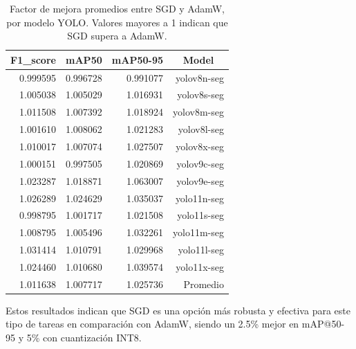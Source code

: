 \begin{table}[htbp]
\centering
\caption[Factor de mejora entre SGD y AdamW en Deepfish, por modelo]{Factor de mejora promedios entre SGD y AdamW, por modelo YOLO. Valores mayores a 1 indican que SGD supera a AdamW.}
\label{tab:deepfish_factorMejora_optimizer_by_model}
\begin{tabular}{|r|r|r|r|}
\hline
\multicolumn{1}{|c|}{\textbf{F1\_score}} & \multicolumn{1}{c|}{\textbf{mAP50}} & \multicolumn{1}{c|}{\textbf{mAP50-95}} & \multicolumn{1}{c|}{\textbf{Model}} \\ \hline
0.999595 & 0.996728 & 0.991077 & yolov8n-seg \\ \hline
1.005038 & 1.005029 & 1.016931 & yolov8s-seg \\ \hline
1.011508 & 1.007392 & 1.018924 & yolov8m-seg \\ \hline
1.001610 & 1.008062 & 1.021283 & yolov8l-seg \\ \hline
1.010017 & 1.007074 & 1.027507 & yolov8x-seg \\ \hline
1.000151 & 0.997505 & 1.020869 & yolov9c-seg \\ \hline
1.023287 & 1.018871 & 1.063007 & yolov9e-seg \\ \hline
1.026289 & 1.024629 & 1.035037 & yolo11n-seg \\ \hline
0.998795 & 1.001717 & 1.021508 & yolo11s-seg \\ \hline
1.008795 & 1.005496 & 1.032261 & yolo11m-seg \\ \hline
1.031414 & 1.010791 & 1.029968 & yolo11l-seg \\ \hline
1.024460 & 1.010680 & 1.039574 & yolo11x-seg \\ \hline
1.011638 & 1.007717 & 1.025736 & Promedio \\ \hline
\end{tabular}
\end{table}

Estos resultados indican que SGD es una opción más robusta y efectiva para este tipo de tareas en comparación con AdamW, siendo un 2.5\% mejor en mAP@50-95 y 5\% con cuantización INT8.

